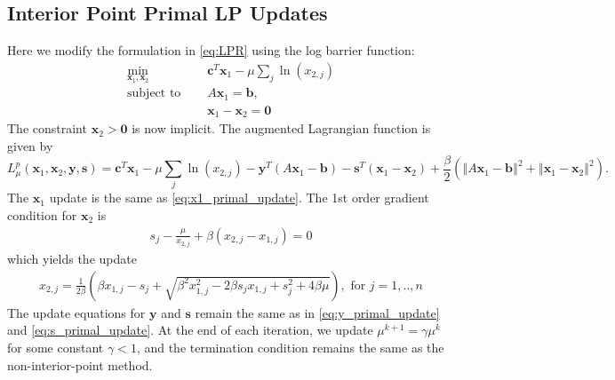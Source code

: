 \documentclass{article}
\begin{document}
\subsection*{Interior Point Primal LP Updates}
Here we modify the formulation in \eqref{eq:LPR} using the log barrier function:
\begin{align}
\min_{ \mathbf{x}_{1}, \mathbf{x}_{2}} &\quad \mathbf{c}^T\mathbf{x}_1 - \mu \sum_j \ln( {x}_{2,j} )\tag{LPRB}\label{LPRB} \\
\text{subject to  \ \  } &\quad  A \mathbf{x}_{1} = \mathbf{b},  \nonumber \\
&\quad \mathbf{x}_{1}  - \mathbf{x}_{2} = \mathbf{0} \nonumber
\end{align}
The constraint $\mathbf{x}_{2} > \mathbf{0}$ is now implicit. The augmented Lagrangian function is given by
\[
L_{\mu}^{p}(\mathbf{x}_{1},\mathbf{x}_{2},\mathbf{y}, \mathbf{s})=\mathbf{c}^{T}\mathbf{x}_{1}-\mu\sum_{j}\ln\left(x_{2,j}\right)-\mathbf{y}^{T}\left(A\mathbf{x}_{1}-\mathbf{b}\right)-\mathbf{s}^{T}\left(\mathbf{x}_{1}-\mathbf{x}_{2}\right)+\frac{\beta}{2}\left(\left\Vert A\mathbf{x}_{1}-\mathbf{b}\right\Vert ^{2}+\left\Vert \mathbf{x}_{1}-\mathbf{x}_{2}\right\Vert ^{2}\right).
\]
The $\mathbf{x}_1$ update is the same as \eqref{eq:x1_primal_update}. The 1st order gradient condition for $\mathbf{x}_2$ is
\begin{align}
s_j - \frac{\mu}{x_{2,j}} + \beta(x_{2,j} - x_{1,j}) = 0
\end{align}
which yields the update
\begin{align}
x_{2,j} = \frac{1}{2\beta}\left(\beta x_{1,j} - s_j  + \sqrt{\beta^2 x_{1,j}^2 - 2\beta s_j x_{1,j} + s_j^2 + 4\beta\mu } \right), \text{ for $j = 1,..,n$}
\end{align}
The update equations for $\mathbf{y}$ and $\mathbf{s}$ remain the same as in \eqref{eq:y_primal_update} and \eqref{eq:s_primal_update}. At the end of each iteration, we update $\mu^{k+1} = \gamma \mu^k$ for some constant $\gamma<1$, and the termination condition remains the same as the non-interior-point method. 
\end{document}
